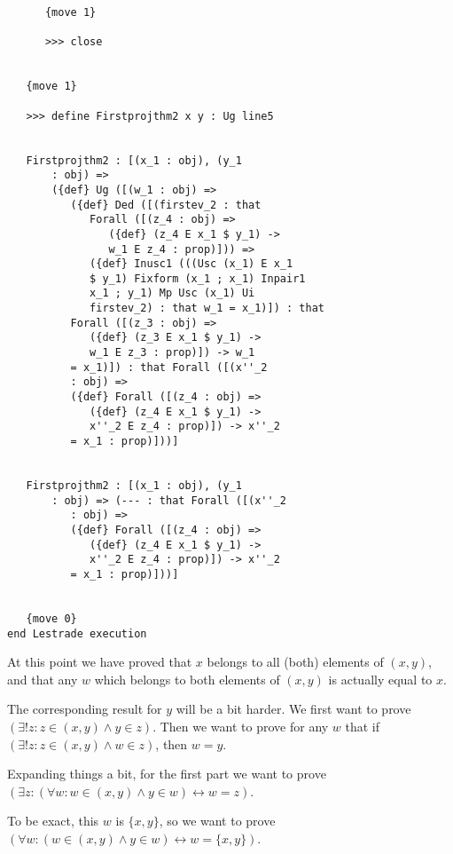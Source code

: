 \documentclass[12pt]{article}
\begin{document}
\begin{verbatim}
      {move 1}

      >>> close


   {move 1}

   >>> define Firstprojthm2 x y : Ug line5


   Firstprojthm2 : [(x_1 : obj), (y_1 
       : obj) => 
       ({def} Ug ([(w_1 : obj) => 
          ({def} Ded ([(firstev_2 : that 
             Forall ([(z_4 : obj) => 
                ({def} (z_4 E x_1 $ y_1) -> 
                w_1 E z_4 : prop)])) => 
             ({def} Inusc1 (((Usc (x_1) E x_1 
             $ y_1) Fixform (x_1 ; x_1) Inpair1 
             x_1 ; y_1) Mp Usc (x_1) Ui 
             firstev_2) : that w_1 = x_1)]) : that 
          Forall ([(z_3 : obj) => 
             ({def} (z_3 E x_1 $ y_1) -> 
             w_1 E z_3 : prop)]) -> w_1 
          = x_1)]) : that Forall ([(x''_2 
          : obj) => 
          ({def} Forall ([(z_4 : obj) => 
             ({def} (z_4 E x_1 $ y_1) -> 
             x''_2 E z_4 : prop)]) -> x''_2 
          = x_1 : prop)]))]


   Firstprojthm2 : [(x_1 : obj), (y_1 
       : obj) => (--- : that Forall ([(x''_2 
          : obj) => 
          ({def} Forall ([(z_4 : obj) => 
             ({def} (z_4 E x_1 $ y_1) -> 
             x''_2 E z_4 : prop)]) -> x''_2 
          = x_1 : prop)]))]


   {move 0}
end Lestrade execution
\end{verbatim}

At this point we have proved that $x$ belongs to all (both) elements of $(x,y)$, and that any $w$ which belongs to both elements of $(x,y)$ is actually equal to $x$.

The corresponding result for $y$ will be a bit harder.  We first want to prove $(\exists! z: z \in (x,y) \wedge y \in z)$.
Then we want to prove for any $w$ that if $(\exists! z: z \in (x,y) \wedge w \in z)$, then $w=y$.

Expanding things a bit, for the first part we want to prove $(\exists z:(\forall w: w \in (x,y) \wedge y \in w) \leftrightarrow w=z)$.

To be exact, this $w$ is $\{x,y\}$, so we want to prove $(\forall w: (w \in (x,y) \wedge y \in w) \leftrightarrow w = \{x,y\})$.
\end{document}
